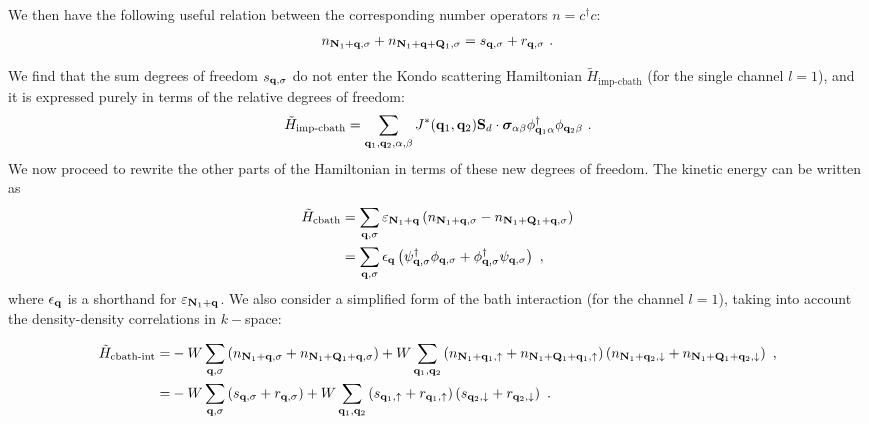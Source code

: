 \documentclass[reprint,hidelinks,onecolumn]{revtex4-2}
\begin{document}
We then have the following useful relation between the corresponding number operators \(n = c^\dagger c\):
\begin{equation}\begin{aligned}\label{numberOperatorRelation}
	n_{{\bf N}_1 + {\bf q},\sigma} + n_{{\bf N}_1 + {\bf q} + {\bf Q}_1, \sigma} = s_{{\bf q}, \sigma} + r_{{\bf q},\sigma}~.
\end{aligned}\end{equation}

We find that the sum degrees of freedom \(s_{{\bf q},\sigma}\) do not enter the Kondo scattering Hamiltonian \(\tilde H_\text{imp-cbath}\) (for the single channel \(l=1\)), and it is expressed purely in terms of the relative degrees of freedom:
\begin{equation}\begin{aligned}
	\tilde H_\text{imp-cbath} = \sum_{{\bf q}_1, {\bf q}_2,\alpha,\beta}J^*({\bf q}_1,{\bf q}_2){\bf S}_d\cdot{\boldsymbol\sigma}_{\alpha\beta} {\phi}^\dagger_{{\bf q}_1\alpha} \phi_{{\bf q}_2\beta}~.
\end{aligned}\end{equation}
We now proceed to rewrite the other parts of the Hamiltonian in terms of these new degrees of freedom. The kinetic energy can be written as
\begin{equation}\begin{aligned}\label{kineticEnergy}
	\tilde H_\text{cbath} &= \sum_{{\bf q},\sigma}\varepsilon_{{\bf N}_1 + {\bf q}}\left(n_{{\bf N}_1 + {\bf q},\sigma} - n_{{\bf N}_1 + {\bf Q}_1 + {\bf q},\sigma}\right)\\
						  &= \sum_{{\bf q},\sigma}\epsilon_{{\bf q}}\left({\psi}^\dagger_{{\bf q},\sigma} {\phi}_{{\bf q},\sigma} + {\phi}^\dagger_{{\bf q},\sigma} \psi_{{\bf q},\sigma}\right)~,
\end{aligned}\end{equation}
where \(\epsilon_{{\bf q}}\) is a shorthand for \(\varepsilon_{{\bf N}_1 + {\bf q}}\).
We also consider a simplified form of the bath interaction (for the channel \(l=1\)), taking into account the density-density correlations in \(k-\)space:
\begin{widetext}
\begin{equation}\begin{aligned}
	\tilde H_\text{cbath-int} =& -W\sum_{{\bf q},\sigma}\left(n_{{\bf N}_1 + {\bf q},\sigma} + n_{{\bf N}_1 + {\bf Q}_1 + {\bf q},\sigma}\right) + W\sum_{{\bf q}_1,{\bf q}_2}\left(n_{{\bf N}_{1} + {\bf q}_1, \uparrow} + n_{{\bf N}_{1} + {\bf Q}_{1} + {\bf q}_1, \uparrow} \right) \left( n_{{\bf N}_{1} + {\bf q}_2, \downarrow} + n_{{\bf N}_{1} + {\bf Q}_{1} + {\bf q}_2, \downarrow} \right)~,\\
	=& -W\sum_{{\bf q},\sigma}\left(s_{{\bf q},\sigma} + r_{{\bf q},\sigma}\right) + W\sum_{{\bf q}_1,{\bf q}_2}\left(s_{{\bf q}_1,\uparrow} + r_{{\bf q}_1,\uparrow}\right) \left(s_{{\bf q}_2,\downarrow} + r_{{\bf q}_2,\downarrow}\right)~.
\end{aligned}\end{equation}
\end{widetext}
\end{document}
